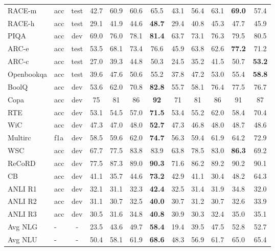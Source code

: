 \documentclass{article}
\begin{document}
\begin{table*}[htb]
\begin{tabular}{llcccccccccc}
        RACE-m & acc & test & 42.7 & 60.9 & 60.6 & 65.5 & 43.1 & 56.4 & 63.1 & \textbf{69.0} & 57.4\\
        RACE-h & acc & test & 29.1 & 41.9 & 44.6 & \textbf{48.7} & 29.4 & 40.8 & 45.3 & 47.7 & 45.9\\
        \addlinespace
        PIQA & acc & dev & 69.0 & 76.0 & 78.1 & \textbf{81.4} & 63.7 & 73.1 & 76.3 & 79.5 & 80.5\\
        ARC-e & acc & test & 53.5 & 68.1 & 73.4 & 76.6 & 45.9 & 63.8 & 62.6 & \textbf{77.2} & 71.2\\
        ARC-c & acc & test & 27.0 & 39.3 & 44.8 & 50.3 & 24.5 & 35.2 & 41.5 & 50.7 & \textbf{53.2}\\
        Openbookqa & acc & test & 39.6 & 47.6 & 50.6 & 55.2 & 37.8 & 47.2 & 53.0 & 55.4 & \textbf{58.8}\\
        \addlinespace
        BoolQ & acc & dev & 53.6 & 62.0 & 70.8 & \textbf{82.8} & 55.7 & 58.1 & 76.4 & 77.5 & 76.7\\
        Copa & acc & dev & 75 & 81 & 86 & \textbf{92} & 71 & 81 & 86 & 91 & 87\\
        RTE & acc & dev & 53.1 & 54.5 & 57.0 & \textbf{71.5} & 53.4 & 55.2 & 62.0 & 58.4 & 70.4\\
        WiC & acc & dev & 47.3 & 47.0 & 48.0 & \textbf{52.7} & 47.3 & 46.8 & 48.0 & 48.7 & 48.6\\
        Multirc & f1a & dev & 58.5 & 59.6 & 62.0 & \textbf{74.7} & 56.3 & 59.4 & 61.9 & 64.2 & 72.9\\
        WSC & acc & dev & 67.7 & 77.5 & 83.8 & 83.9 & 63.8 & 78.5 & 83.0 & \textbf{86.3} & 69.2\\
        ReCoRD & acc & dev & 77.5 & 87.3 & 89.0 & \textbf{90.3} & 71.6 & 86.2 & 89.2 & 90.2 & 90.1\\
        CB & acc & dev & 41.1 & 35.7 & 44.6 & \textbf{73.2} & 42.9 & 41.1 & 30.4 & 48.2 & 64.3\\
        \addlinespace
        ANLI R1 & acc & dev & 32.1 & 31.1 & 32.3 & \textbf{42.4} & 32.5 & 31.4 & 31.9 & 34.8 & 32.0\\
        ANLI R2 & acc & dev & 31.1 & 30.7 & 32.5 & \textbf{40.0} & 30.7 & 31.2 & 30.7 & 32.6 & 33.9\\
        ANLI R3 & acc & dev & 30.5 & 31.6 & 34.8 & \textbf{40.8} & 30.9 & 30.3 & 32.4 & 35.0 & 35.1\\
        \addlinespace
        Avg NLG & - & - & 23.5 & 43.6 & 49.7 & \textbf{58.4} & 19.4 & 39.5 & 47.5 & 52.8 & 52.7 \\ 
        Avg NLU & - & - & 50.4 & 58.1 & 61.9 & \textbf{68.6} & 48.3 & 56.9 & 61.7 & 65.0 & 65.4\\
        \bottomrule
    \end{tabular}
\end{table*}
\end{document}
